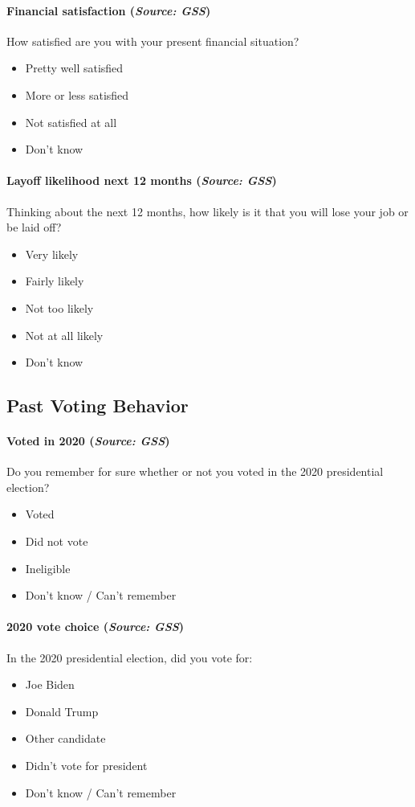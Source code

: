 \paragraph{Financial satisfaction (\textit{Source: GSS})}
How satisfied are you with your present financial situation?
\begin{itemize}[itemsep=-10pt,topsep=0pt]
\item Pretty well satisfied
\item More or less satisfied
\item Not satisfied at all
\item Don’t know
\end{itemize}

\paragraph{Layoff likelihood next 12 months (\textit{Source: GSS})}
Thinking about the next 12 months, how likely is it that you will lose your job or be laid off?
\begin{itemize}[itemsep=-10pt,topsep=0pt]
\item Very likely
\item Fairly likely
\item Not too likely
\item Not at all likely
\item Don’t know
\end{itemize}


\subsection{Past Voting Behavior}

\paragraph{Voted in 2020 (\textit{Source: GSS})}
Do you remember for sure whether or not you voted in the 2020 presidential election?
\begin{itemize}[itemsep=-10pt,topsep=0pt]
\item Voted
\item Did not vote
\item Ineligible
\item Don’t know / Can’t remember
\end{itemize}

\paragraph{2020 vote choice (\textit{Source: GSS})}
In the 2020 presidential election, did you vote for:
\begin{itemize}[itemsep=-10pt,topsep=0pt]
\item Joe Biden
\item Donald Trump
\item Other candidate
\item Didn’t vote for president
\item Don’t know / Can’t remember
\end{itemize}

